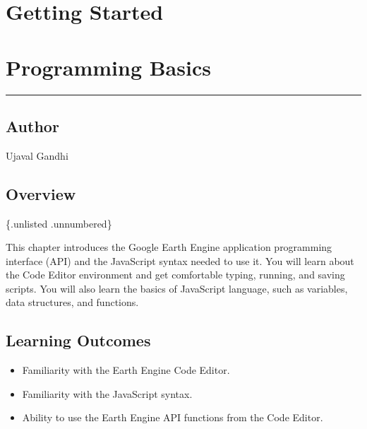 \documentclass[
  letterpaper,
  DIV=11,
  numbers=noendperiod]{scrreprt}
\providecommand{\tightlist}{%
  \setlength{\itemsep}{0pt}\setlength{\parskip}{0pt}}\usepackage{longtable,booktabs,array}
\begin{document}
\hypertarget{getting-started}{%
\chapter{Getting Started}\label{getting-started}}

\hypertarget{programming-basics}{%
\chapter{Programming Basics}\label{programming-basics}}

\begin{center}\rule{0.5\linewidth}{0.5pt}\end{center}

\hypertarget{author}{%
\section*{Author}\label{author}}


Ujaval Gandhi

\hypertarget{overview}{%
\section*{Overview}\label{overview}}


\{.unlisted .unnumbered\}

This chapter introduces the Google Earth Engine application programming
interface (API) and the JavaScript syntax needed to use it. You will
learn about the Code Editor environment and get comfortable typing,
running, and saving scripts. You will also learn the basics of
JavaScript language, such as variables, data structures, and functions.

\hypertarget{learning-outcomes}{%
\section*{Learning Outcomes}\label{learning-outcomes}}


\begin{itemize}
\tightlist
\item
  Familiarity with the Earth Engine Code Editor.
\item
  Familiarity with the JavaScript syntax.
\item
  Ability to use the Earth Engine API functions from the Code Editor.
\end{itemize}
\end{document}
